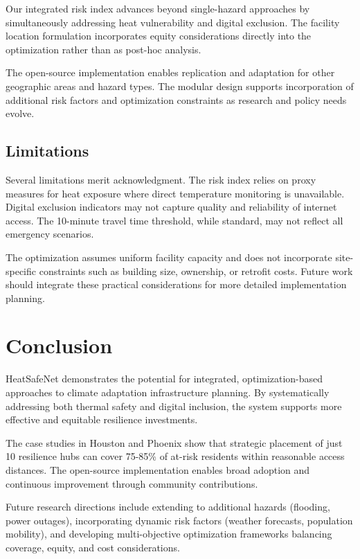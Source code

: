 \documentclass[conference]{IEEEtran}
\begin{document}
Our integrated risk index advances beyond single-hazard approaches by simultaneously addressing heat vulnerability and digital exclusion. The facility location formulation incorporates equity considerations directly into the optimization rather than as post-hoc analysis.

The open-source implementation enables replication and adaptation for other geographic areas and hazard types. The modular design supports incorporation of additional risk factors and optimization constraints as research and policy needs evolve.

\subsection{Limitations}

Several limitations merit acknowledgment. The risk index relies on proxy measures for heat exposure where direct temperature monitoring is unavailable. Digital exclusion indicators may not capture quality and reliability of internet access. The 10-minute travel time threshold, while standard, may not reflect all emergency scenarios.

The optimization assumes uniform facility capacity and does not incorporate site-specific constraints such as building size, ownership, or retrofit costs. Future work should integrate these practical considerations for more detailed implementation planning.

\section{Conclusion}

HeatSafeNet demonstrates the potential for integrated, optimization-based approaches to climate adaptation infrastructure planning. By systematically addressing both thermal safety and digital inclusion, the system supports more effective and equitable resilience investments.

The case studies in Houston and Phoenix show that strategic placement of just 10 resilience hubs can cover 75-85\% of at-risk residents within reasonable access distances. The open-source implementation enables broad adoption and continuous improvement through community contributions.

Future research directions include extending to additional hazards (flooding, power outages), incorporating dynamic risk factors (weather forecasts, population mobility), and developing multi-objective optimization frameworks balancing coverage, equity, and cost considerations.
\end{document}
